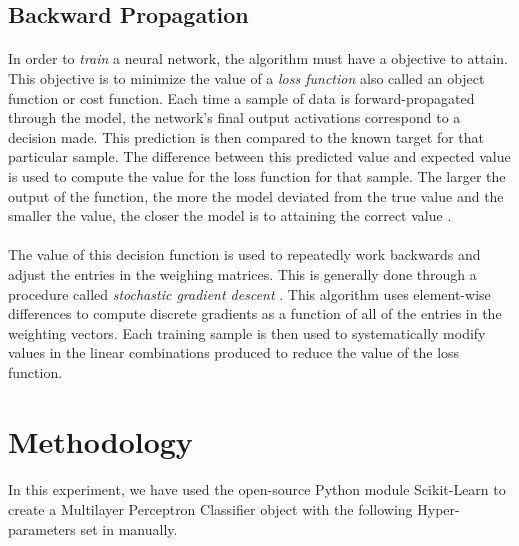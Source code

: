 \documentclass[12pt,letterpaper]{article}
\begin{document}
\subsection{Backward Propagation}
\paragraph*{}In order to \textit{train} a neural network, the algorithm must have a objective to attain. This objective is to minimize the value of a \textit{loss function} \cite{James} also called an object function or cost function. Each time a sample of data is forward-propagated through the model, the network's final output activations correspond to a decision made. This prediction is then compared to the known target for that particular sample. The difference between this predicted value and expected value is used to compute the value for the loss function for that sample. The larger the output of the function, the more the model deviated from the true value and the smaller the value, the closer the model is to attaining the correct value \cite{Goodfellow}. 
\paragraph*{}The value of this decision function is used to repeatedly work backwards and adjust the entries in the weighing matrices. This is generally done through a procedure called \textit{stochastic gradient descent} \cite{Geron}. This algorithm uses element-wise differences to compute discrete gradients as a function of all of the entries in the weighting vectors. Each training sample is then used to systematically modify values in the linear combinations produced to reduce the value of the loss function. 


\section{Methodology}
\paragraph*{}In this experiment, we have used the open-source Python module Scikit-Learn to create a Multilayer Perceptron Classifier object with the following Hyper-parameters set in manually.


\end{document}
